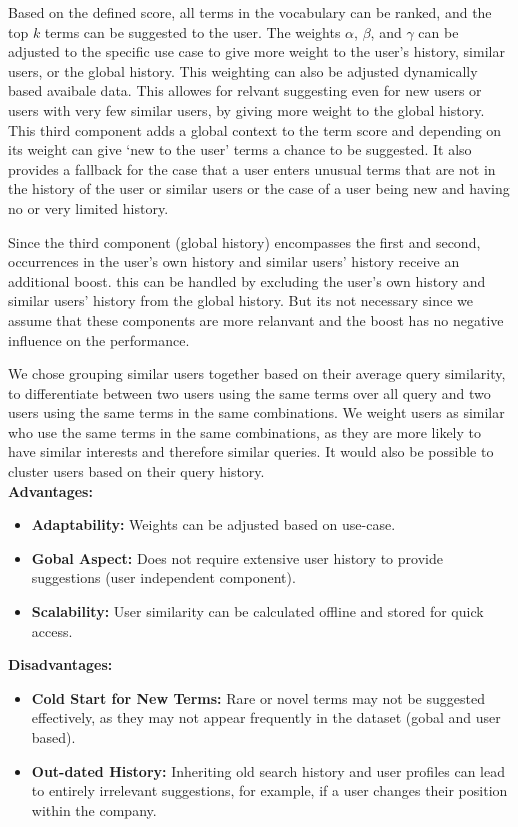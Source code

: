 Based on the defined score, all terms in the vocabulary can be ranked, and the top $k$ terms can be suggested to the user. The weights $\alpha$, $\beta$, and $\gamma$ can be adjusted to the specific use case to give more weight to the user's history, similar users, or the global history. This weighting can also be adjusted dynamically based avaibale data. This allowes for relvant suggesting even for new users or users with very few similar users, by giving more weight to the global history. This third component adds a global context to the term score and depending on its weight can give `new to the user' terms a chance to be suggested. It also provides a fallback for the case that a user enters unusual terms that are not in the history of the user or similar users or the case of a user being new and having no or very limited history.

Since the third component (global history) encompasses the first and second, occurrences in the user's own history and similar users' history receive an additional boost. this can be handled by excluding the user's own history and similar users' history from the global history. But its not necessary since we assume that these components are more relanvant and the boost has no negative influence on the performance.

We chose grouping similar users together based on their average query similarity, to differentiate between two users using the same terms over all query and two users using the same terms in the same combinations. We weight users as similar who use the same terms in the same combinations, as they are more likely to have similar interests and therefore similar queries. It would also be possible to cluster users based on their query history.\\

\textbf{Advantages:}
\begin{itemize}
    \item \textbf{Adaptability:} Weights can be adjusted based on use-case.
    \item \textbf{Gobal Aspect:} Does not require extensive user history to provide suggestions (user independent component).
    \item \textbf{Scalability:} User similarity can be calculated offline and stored for quick access.
\end{itemize}

\textbf{Disadvantages:}
\begin{itemize}
    \item \textbf{Cold Start for New Terms:} Rare or novel terms may not be suggested effectively, as they may not appear frequently in the dataset (gobal and user based).
    \item \textbf{Out-dated History:} Inheriting old search history and user profiles can lead to entirely irrelevant suggestions, for example, if a user changes their position within the company.
\end{itemize}
